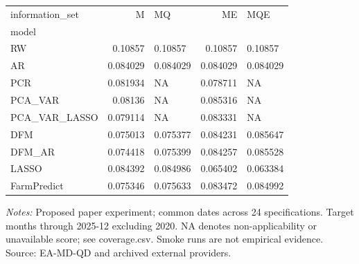 \begin{threeparttable}
\begin{tabular}{lrlrl}
\toprule
information\_set & M & MQ & ME & MQE \\
model &  &  &  &  \\
\midrule
RW & 0.10857 & 0.10857 & 0.10857 & 0.10857 \\
AR & 0.084029 & 0.084029 & 0.084029 & 0.084029 \\
PCR & 0.081934 & NA & 0.078711 & NA \\
PCA\_VAR & 0.08136 & NA & 0.085316 & NA \\
PCA\_VAR\_LASSO & 0.079114 & NA & 0.083331 & NA \\
DFM & 0.075013 & 0.075377 & 0.084231 & 0.085647 \\
DFM\_AR & 0.074418 & 0.075399 & 0.084257 & 0.085528 \\
LASSO & 0.084392 & 0.084986 & 0.065402 & 0.063384 \\
FarmPredict & 0.075346 & 0.075633 & 0.083472 & 0.084992 \\
\bottomrule
\end{tabular}
\begin{tablenotes}[flushleft]\footnotesize
\item \textit{Notes:} Proposed paper experiment; common dates across 24 specifications. Target months through 2025-12 excluding 2020. NA denotes non-applicability or unavailable score; see coverage.csv. Smoke runs are not empirical evidence. Source: EA-MD-QD and archived external providers.
\end{tablenotes}
\end{threeparttable}
